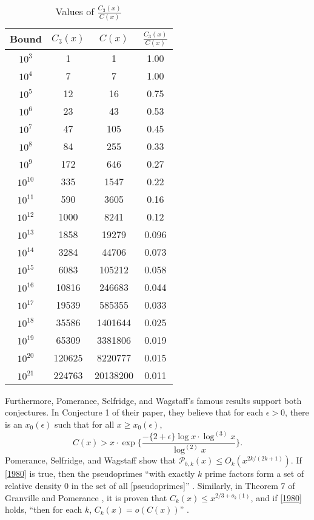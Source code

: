 \documentclass[11pt]{article}
\theoremstyle{plain}
\theoremstyle{definition}
\theoremstyle{remark}
\numberwithin{equation}{subsection}
\begin{document}
\begin{table}[ht]
\caption{Values of $\frac{C_3(x)}{C(x)}$}
\centering
\begin{tabular}{ || c | c | c | c || }
    \hline
\textbf{Bound} & \textbf{$C_3(x)$} & \textbf{$C(x)$} & \textbf{$\frac{C_3(x)}{C(x)}$}\\ \hline
$10^{3}$ & 1 & 1 & 1.00\\
$10^{4}$ & 7 & 7 & 1.00\\
$10^{5}$ & 12 & 16 & 0.75\\
$10^{6}$ & 23 & 43 & 0.53\\
$10^{7}$ & 47 & 105 & 0.45\\
$10^{8}$ & 84 & 255 & 0.33\\
$10^{9}$ & 172 & 646 & 0.27\\
$10^{10}$ & 335 & 1547 & 0.22\\
$10^{11}$ & 590 & 3605 & 0.16\\
$10^{12}$ & 1000 & 8241 & 0.12\\
$10^{13}$ & 1858 & 19279 & 0.096\\
$10^{14}$ & 3284 & 44706 & 0.073\\
$10^{15}$ & 6083 & 105212 & 0.058\\
$10^{16}$ & 10816 & 246683 & 0.044\\
$10^{17}$ & 19539 & 585355 & 0.033\\
$10^{18}$ & 35586 & 1401644 & 0.025\\
$10^{19}$ & 65309 & 3381806 & 0.019\\
$10^{20}$ & 120625 & 8220777 & 0.015\\
$10^{21}$ & 224763 & 20138200 & 0.011\\ \hline
\end{tabular}
\label{table7}
\end{table}
\newline
\indent Furthermore, Pomerance, Selfridge, and Wagstaff's famous results \cite{10} support both conjectures. In Conjecture 1 of their paper, they believe that for each $\epsilon > 0$, there is an $x_0(\epsilon)$ such that for all $x \ge x_0(\epsilon)$,
\begin{equation} \label{1980}
C(x) > x \cdot \exp\Big\{\frac{-\{2+\epsilon\}\log x \cdot \log^{(3)} x}{\log^{(2)} x}\Bigr\}.
\end{equation}
Pomerance, Selfridge, and Wagstaff \cite{10} show that $\mathscr{P}_{b,k}(x) \le O_k(x^{2k/(2k+1)})$. If \eqref{1980} is true, then the pseudoprimes ``with exactly $k$ prime factors form a set of relative density 0 in the set of all [pseudoprimes]'' \cite{10}. Similarly, in Theorem 7 of Granville and Pomerance \cite{8}, it is proven that $C_k(x) \le x^{2/3+o_k(1)}$, and if \eqref{1980} holds, ``then for each $k$, $C_k(x) = o(C(x))$'' \cite{10}.\newline
\end{document}
